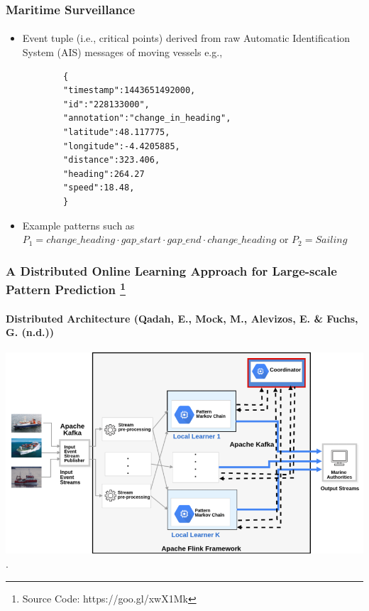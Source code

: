 \begin{frame}[fragile]
	
	\frametitle{Maritime Surveillance}
	\framesubtitle{}
	\begin{itemize}
		\item<only@1> Event tuple (i.e., critical points) derived from raw Automatic Identification System (AIS) messages of moving vessels e.g., 
		\begin{verbatim}
		{
		"timestamp":1443651492000,
		"id":"228133000",
		"annotation":"change_in_heading",
		"latitude":48.117775,
		"longitude":-4.4205885,
		"distance":323.406,
		"heading":264.27
		"speed":18.48,
		}
		\end{verbatim}
		
		\item<only@1> Example patterns such as 
		$P_1=\mathit{change\_heading} \cdot \mathit{gap\_start} \cdot \mathit{gap\_end} \cdot 
		\mathit{change\_heading}$ or $P_2=\mathit{Sailing}$
	\end{itemize}
\end{frame}


\frame
{
	\frametitle{A Distributed Online Learning Approach for Large-scale Pattern Prediction \footnote{Source Code: https://goo.gl/xwX1Mk}}
	\framesubtitle{Distributed Architecture (Qadah, E., Mock, M., Alevizos, E. \& Fuchs, G. (n.d.))}
	\begin{center}
		\includegraphics[width=1.05\textwidth,left,height=.58\linewidth]{figures/distributed_architecture_2.png}
.
	\end{center}
}

